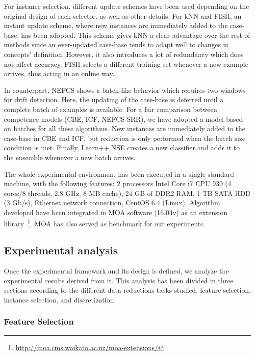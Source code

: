 \documentclass[preprint,12pt]{elsarticle}
\begin{document}
For instance selection, different update schemes have been used depending on the original design of each selector, as well as other details. For kNN and FISH, an instant update scheme, where new instances are immediately added to the case-base, has been adopted. This scheme gives kNN a clear advantage over the rest of methods since an ever-updated case-base tends to adapt well to changes in concepts' definition. However, it also introduces a lot of redundancy which does not affect accuracy. FISH selects a different training set whenever a new example arrives, thus acting in an online way.

In counterpart, NEFCS shows a batch-like behavior which requires two windows for drift detection. Here, the updating of the case-base is deferred until a complete batch of examples is available. For a fair comparison between competence models (CBE, ICF, NEFCS-SRR), we have adopted a model based on batches for all these algorithms. New instances are immediately added to the case-base in CBE and ICF, but reduction is only performed when the batch size condition is met. Finally, Learn++.NSE creates a new classifier and adds it to the ensemble whenever a new batch arrives. 

The whole experimental environment has been executed in a single standard machine, with the following features: 2 processors Intel Core i7 CPU 930 (4 cores/8 threads, 2.8 GHz, 8 MB cache), 24 GB of DDR2 RAM, 1 TB SATA HDD (3 Gb/s), Ethernet network connection, CentOS 6.4 (Linux). Algorithm developed have been integrated in MOA software (16.04v) as an extension library~\footnote{\url{http://moa.cms.waikato.ac.nz/moa-extensions/}}. MOA has also served as benchmark for our experiments.

\subsection{Experimental analysis}

Once the experimental framework and its design is defined, we analyze the experimental results derived from it. This analysis has been divided in three sections according to the different data reductions tasks studied: feature selection, instance selection, and discretization.

\subsubsection{\textbf{Feature Selection}}
\label{subsubsec:fsel}
\end{document}
